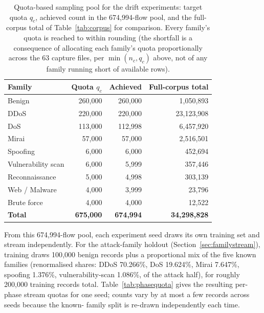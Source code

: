 \documentclass[11pt,a4paper]{article}
\begin{document}
\begin{table}[!ht]
\centering
\caption{Quota-based sampling pool for the drift experiments: target quota
$q_c$, achieved count in the 674{,}994-flow pool, and the full-corpus total
of Table~\ref{tab:corpus} for comparison. Every family's quota is reached to
within rounding (the shortfall is a consequence of allocating each family's
quota proportionally across the 63 capture files, per $\min(n_c, q_c)$ above,
not of any family running short of available rows).}
\label{tab:quota}
\small
\begin{tabular}{lrrr}
\toprule
\textbf{Family} & \textbf{Quota $q_c$} & \textbf{Achieved} & \textbf{Full-corpus total} \\
\midrule
Benign              & 260{,}000 & 260{,}000 & 1{,}050{,}893 \\
DDoS                & 220{,}000 & 220{,}000 & 23{,}123{,}908 \\
DoS                 & 113{,}000 & 112{,}998 & 6{,}457{,}920 \\
Mirai               &  57{,}000 &  57{,}000 & 2{,}516{,}501 \\
Spoofing            &   6{,}000 &   6{,}000 & 452{,}694 \\
Vulnerability scan  &   6{,}000 &   5{,}999 & 357{,}446 \\
Reconnaissance      &   5{,}000 &   4{,}998 & 303{,}139 \\
Web / Malware       &   4{,}000 &   3{,}999 & 23{,}796 \\
Brute force         &   4{,}000 &   4{,}000 & 12{,}522 \\
\midrule
\textbf{Total}      & \textbf{675{,}000} & \textbf{674{,}994} & \textbf{34{,}298{,}828} \\
\bottomrule
\end{tabular}
\end{table}

From this 674{,}994-flow pool, each experiment seed draws its own training set
and stream independently. For the attack-family holdout
(Section~\ref{sec:familystream}), training draws 100{,}000 benign records plus
a proportional mix of the five known families (renormalised shares: DDoS
70.266\%, DoS 19.624\%, Mirai 7.647\%, spoofing 1.376\%, vulnerability-scan
1.086\%, of the attack half), for roughly 200{,}000 training records total.
Table~\ref{tab:phasequota} gives the resulting per-phase stream quotas for one
seed; counts vary by at most a few records across seeds because the known-
family split is re-drawn independently each time.
\end{document}

